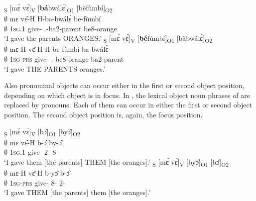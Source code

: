 \ea\label{SVOO2}
\ea \label{SVOO2a}
  \glll [$\emptyset$]\textsubscript{S} [mɛ̀ vɛ́]\textsubscript{V} [{\bfseries bá}bwálɛ̀]\textsubscript{O1} [bèfùmbí]\textsubscript{O2} \\
    {\db}$\emptyset$   {\db}mɛ vɛ̂-H {\db}H-ba-bwálɛ̀ {\db}be-fùmbí\\
      {\db}$\emptyset$ {\db}1\textsc{sg}.{\PST}1 give-{\R} {\db}{\OBJ}.{\LINK}-ba2-parent {\db}be8-orange\\
    \trans `I gave the parents ORANGES.'
\ex \label{SVOO2b}
  \glll [$\emptyset$]\textsubscript{S}  [mɛ́ vɛ́]\textsubscript{V} [{\bfseries bé}fùmbí]\textsubscript{O1} [bàbwálɛ̀]\textsubscript{O2} \\
    {\db}$\emptyset$ {\db}mɛ-H vɛ̂-H {\db}H-be-fùmbí {\db}ba-bwálɛ̀ \\
      {\db}$\emptyset$ {\db}1\textsc{sg}-\textsc{prs} give-{\R} {\db}{\OBJ}.{\LINK}-be8-orange {\db}ba2-parent\\
    \trans `I gave THE PARENTS oranges.'
\z
\z

\noindent Also pronominal objects can occur either in the first or second object position, depending on which object is in focus. In , the lexical object noun phrases of  are replaced by pronouns. Each of them can occur in either the first or second object position. The second object position is, again, the focus position.

\ea\label{SVOO3}
\ea \label{SVOO3a}
  \glll [$\emptyset$]\textsubscript{S} [mɛ̀ vɛ́]\textsubscript{V} [bɔ̂]\textsubscript{O1} [byɔ̂]\textsubscript{O2} \\
       {\db}$\emptyset$ {\db}mɛ vɛ̂-H {\db}b-ɔ̂ {\db}by-ɔ̂\\
        {\db}$\emptyset$  {\db}1\textsc{sg}.{\PST}1 give-{\R} {\db}2-{\OBJ} {\db}8-{\OBJ}  \\
    \trans `I gave them [the parents] THEM [the oranges].'
\ex \label{SVOO3b}
  \glll [$\emptyset$]\textsubscript{S}  [mɛ́ vɛ́]\textsubscript{V} [byɔ̂]\textsubscript{O1} [bɔ̂]\textsubscript{O2} \\
      {\db}$\emptyset$ {\db}mɛ-H vɛ̂-H {\db}b-yɔ̂ {\db}b-ɔ̂\\
      {\db}$\emptyset$  {\db}1\textsc{sg}-\textsc{prs} give-{\R} {\db}8-{\OBJ} {\db}2-{\OBJ} \\
    \trans `I gave THEM [the parents] them [the oranges].'
\z
\z




